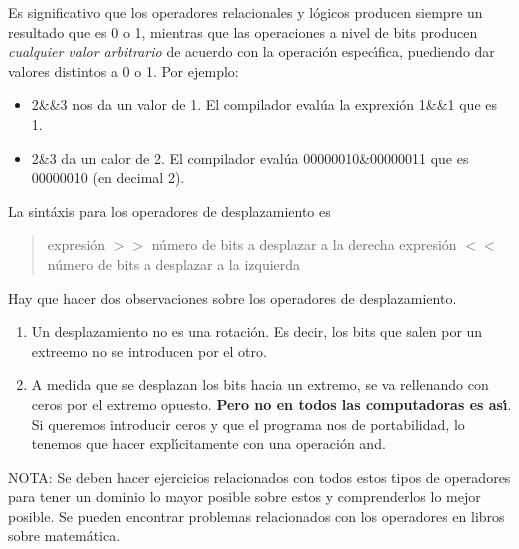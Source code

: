 Es significativo que los operadores relacionales y l\'ogicos producen siempre
un resultado que es 0 o 1, mientras que las operaciones a nivel de bits
producen \emph{cualquier valor arbitrario} de acuerdo con la operaci\'on
espec\'{\i}fica, puediendo dar valores distintos a 0 o 1. Por ejemplo:

\begin{itemize}

\item 2\&\&3 nos da un valor de 1. El compilador eval\'ua la exprexi\'on
1\&\&1 que es 1.

\item 2\&3 da un calor de 2. El compilador eval\'ua 00000010\&00000011 que es
00000010 (en decimal 2).

\end{itemize}

La sint\'axis para los operadores de desplazamiento es 

\begin{quotation}

expresi\'on $>>$ n\'umero de bits a desplazar a la derecha
expresi\'on $<<$ n\'umero de bits a desplazar a la izquierda

\end{quotation}

Hay que hacer dos observaciones sobre los operadores de desplazamiento.

\begin{enumerate}

\item Un desplazamiento no es una rotaci\'on. Es decir, los bits que salen
por un extreemo no se introducen por el otro.

\item A medida que se desplazan los bits hacia un extremo, se va rellenando
con ceros por el extremo opuesto. \textbf{Pero no en todos las computadoras
es as\'{\i}}. Si queremos introducir ceros y que el programa nos de 
portabilidad, lo tenemos que hacer expl\'{\i}citamente con una operaci\'on
and.

\end{enumerate}

\begin{description}

\item NOTA: Se deben hacer ejercicios relacionados con todos estos tipos de 
operadores para tener un dominio lo mayor posible sobre estos y comprenderlos
lo mejor posible. Se pueden encontrar problemas relacionados con los 
operadores en libros sobre matem\'atica.

\end{description}

